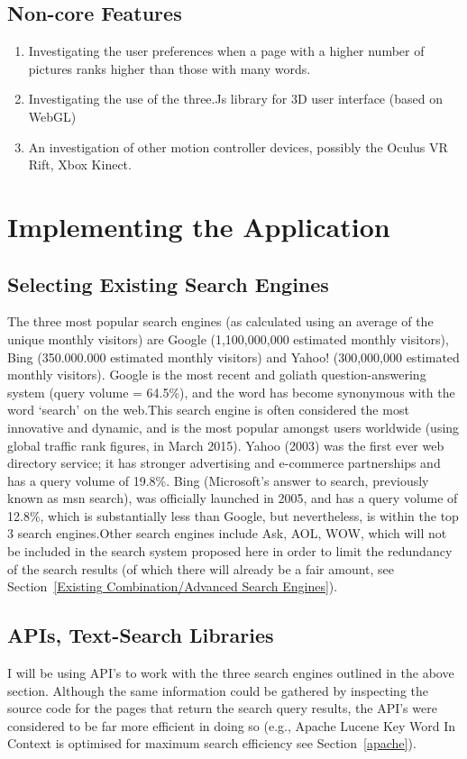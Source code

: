 \documentclass[10pt]{article}
\begin{document}
\subsection{Non-core Features}
\begin{enumerate}

\item Investigating the user preferences when a page with a higher number of pictures ranks higher than those with many words. 
\item Investigating the use of the three.Js library for 3D user interface (based on WebGL)
\item An investigation of other motion controller devices, possibly the Oculus VR Rift, Xbox Kinect.

\end{enumerate}

\section{Implementing the Application}\label{api}
\subsection{Selecting Existing Search Engines}
The three most popular search engines (as calculated using an average of the unique monthly visitors) are Google (1,100,000,000 estimated monthly visitors), Bing (350.000.000 estimated monthly visitors) and Yahoo! (300,000,000 estimated monthly visitors)\cite{ebiz}. Google is the most recent and goliath question-answering system (query volume = 64.5\%)\cite{adam}, and the word has become synonymous with the word ‘search’ on the web.This search engine is often considered the most innovative and dynamic, and is the most popular amongst users worldwide (using global traffic rank figures, in March 2015). Yahoo (2003) was the first ever web directory service; it has stronger advertising and e-commerce partnerships and has a query volume of 19.8\%. Bing (Microsoft’s answer to search, previously known as msn search), was officially launched in 2005, and has a query volume of 12.8\%, which is substantially less than Google, but nevertheless, is within the top 3 search engines.Other search engines include Ask, AOL, WOW, which will not be included in the search system proposed here in order to limit the redundancy of the search results (of which there will already be a fair amount, see Section~\ref{Existing Combination/Advanced Search Engines}). 

\subsection{APIs, Text-Search Libraries}
I will be using API’s to work with the three search engines outlined in the above section. Although the same information could be gathered by inspecting the source code for the pages that return the search query results, the API’s were considered to be far more efficient in doing so (e.g., Apache Lucene Key Word In Context is optimised for maximum search efficiency see Section~\ref{apache}). 
\end{document}
